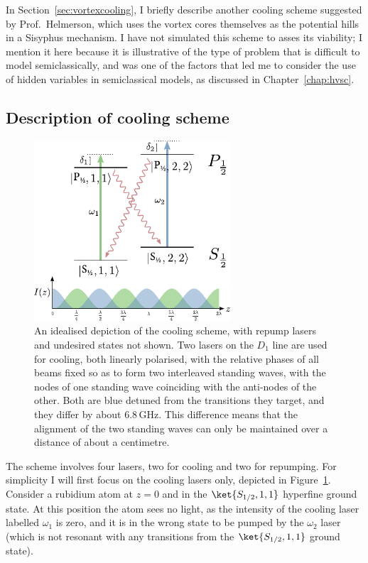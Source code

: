 In Section~\ref{sec:vortexcooling}, I briefly describe another cooling scheme suggested by Prof.~Helmerson, which uses the vortex cores themselves as the potential hills in a Sisyphus mechanism. I have not simulated this scheme to asses its viability; I mention it here because it is illustrative of the type of problem that is difficult to model semiclassically, and was one of the factors that led me to consider the use of hidden variables in semiclassical models, as discussed in Chapter~\ref{chap:hvsc}.


\subsection{Description of cooling scheme}

\begin{figure}
\begin{center}
\includegraphics[width=0.65\textwidth]{figures/unsorted/cooling_simplified.pdf}
\caption{\label{fig:cooling_simplified}An idealised depiction of the cooling scheme, with repump lasers and undesired states not shown. Two lasers on the $D_1$ line are used for cooling, both linearly polarised, with the relative phases of all beams fixed so as to form two interleaved standing waves, with the nodes of one standing wave coinciding with the anti-nodes of the other. Both are blue detuned from the transitions they target, and they differ by about $6.8\,$GHz. This difference means that the alignment of the two standing waves can only be maintained over a distance of about a centimetre.}
\end{center}
\end{figure}

The scheme involves four lasers, two for cooling and two for repumping. For simplicity I will first focus on the cooling lasers only, depicted in Figure~\ref{fig:cooling_simplified}. Consider a rubidium atom at $z=0$ and in the $\ket{S_{1/2}, 1,1}$ hyperfine ground state. At this position the atom sees no light, as the intensity of the cooling laser labelled $\omega_1$ is zero, and it is in the wrong state to be pumped by the $\omega_2$ laser (which is not resonant with any transitions from the $\ket{S_{1/2}, 1,1}$ ground state).


